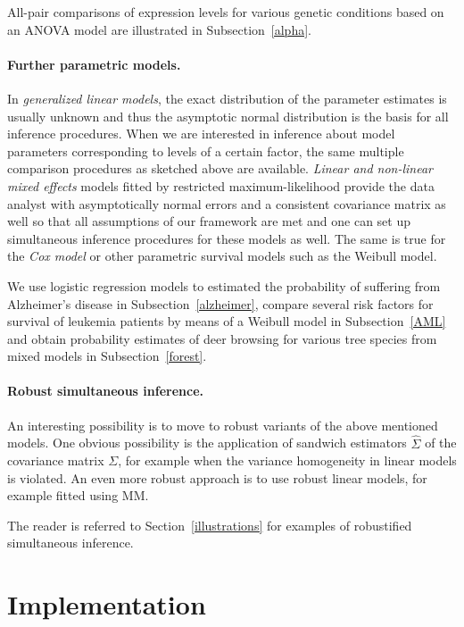 \documentclass[12pt]{article}
\begin{document}
All-pair comparisons of expression levels for various genetic conditions 
based on an ANOVA model are illustrated in Subsection~\ref{alpha}.

\paragraph{Further parametric models.}

In \emph{generalized linear models}, the exact distribution of the parameter estimates
is usually unknown and thus the asymptotic normal distribution is the basis for all
inference procedures. When we are interested in inference about model
parameters corresponding to levels of a certain factor, the same multiple 
comparison procedures as sketched above are available. 
\emph{Linear and non-linear mixed effects} models fitted by restricted
maximum-likelihood provide
the data analyst with asymptotically normal errors and a consistent
covariance matrix as well so that all assumptions of our framework
are met and one can set up simultaneous inference procedures
for these models as well.
The same is true for the \emph{Cox model} or other parametric survival models
such as the Weibull model.

We use logistic regression models to estimated the probability of suffering
from Alzheimer's disease in Subsection~\ref{alzheimer}, compare several risk
factors for survival of leukemia patients by means of a Weibull model in
Subsection~\ref{AML} and obtain probability estimates of deer browsing for
various tree species from mixed models in Subsection~\ref{forest}.

\paragraph{Robust simultaneous inference.}

An interesting possibility is to move to robust variants of the above
mentioned models. One obvious possibility is the application
of sandwich estimators $\hat{\Sigma}$ of the covariance matrix $\Sigma$, 
for example when the variance homogeneity in linear models is violated.
An even more robust approach is to use robust linear models, for example
fitted using MM.

The reader is referred to Section~\ref{illustrations} for examples of
robustified simultaneous inference.

\section{Implementation} \label{implementation}
\end{document}
